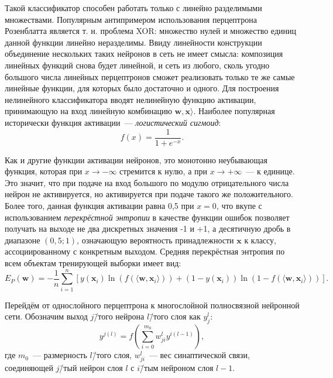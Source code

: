 Такой классификатор способен работать только с линейно разделимыми множествами. Популярным антипримером использования перцептрона Розенблатта является т. н. проблема XOR: множество нулей и множество единиц данной функции линейно неразделимы. Ввиду линейности конструкции объединение нескольких таких нейронов в сеть не имеет смысла: композиция линейных функций снова будет линейной, и сеть из любого, сколь угодно большого числа линейных перцептронов сможет реализовать только те же самые линейные функции, для которых было достаточно и одного. Для построения нелинейного классификатора вводят нелинейную функцию активации, принимающую на вход линейную комбинацию $ \boldsymbol{w}, \boldsymbol{x} \rangle $. Наиболее популярная исторически функция активации~--- \textit{логистический сигмоид}:
\begin{equation*}
f(x) = \frac{1}{1 + e^{-x}}.
\end{equation*}

Как и другие функции активации нейронов, это монотонно неубывающая функция, которая при $ x \to -\infty $ стремится к нулю, а при $ x \to +\infty $~--- к единице. Это значит, что при подаче на вход большого по модулю отрицательного числа нейрон не активируется, но активируется при подаче такого же положительного. Более того, данная функция активации равна 0,5 при $ x = 0 $, что вкупе с использованием \textit{перекрёстной энтропии} в качестве функции ошибок позволяет получать на выходе не два дискретных значения -1 и +1, а десятичную дробь в диапазоне $ (0,5; 1) $, означающую вероятность принадлежности $ \boldsymbol{x} $ к классу, ассоциированному с конкретным выходом. Средняя перекрёстная энтропия по всем объектам тренирующей выборки имеет вид:
\begin{equation*}
E_P(\boldsymbol{w}) = -\frac{1}{n} \sum_{i = 1}^n [y(\boldsymbol{x}_i)\ln(f(\langle \boldsymbol{w}, \boldsymbol{x}_i \rangle)) + (1 - y(\boldsymbol{x}_i))\ln(1 - f(\langle \boldsymbol{w}, \boldsymbol{x}_i \rangle))].
\end{equation*}

Перейдём от однослойного перцептрона к многослойной полносвязной нейронной сети. Обозначим выход $ j $\=/того нейрона $ l $\=/того слоя как $ y_j^l $:
\begin{equation*}
y^{j(l)} = f(\sum_{i = 0}^{m_0} w_{ji}^ly^{i(l - 1)}),
\end{equation*}
где $ m_0 $~--- размерность $ l $\=/того слоя, $ w_{ji}^l $~--- вес синаптической связи, соединяющей $ j $\=/тый нейрон слоя $ l $ с $ i $\=/тым нейроном слоя $ l - 1 $.

